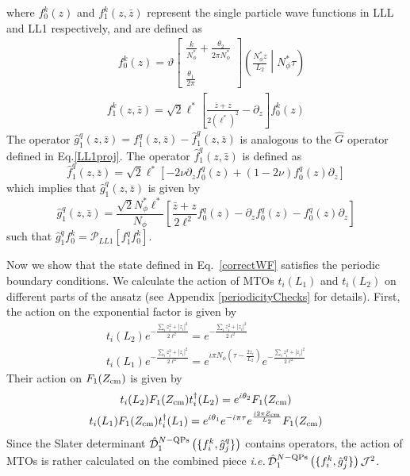 \documentclass[prb,aps,epsfig,longbibliography,twocolumn]{revtex4-1}
\newcommand{\ie}{\emph{i.e.}\,}
\newcommand{\rbkt}[1]{\left( #1\right)}
\newcommand{\sbkt}[1]{\left[ #1\right]}
\newcommand{\np}{N_{\phi}}
\newcommand{\jbkt}[2]{\left( #1 \middle| #2\right)}
\newcommand{\rtheta}[4]{\vartheta \sbkt{ \substack{{#1} \\ \\{#2}}}	\jbkt{#3}{#4}}
\newcommand{\iiota}{\dot{\iota}}
\begin{document}
where $f_0^{k}(z)$ and $f^{k}_1(z,\bar{z})$ represent the single particle wave functions in LLL and LL1 respectively, and are defined as \cite{Pu2017}
\begin{gather}
\quad f_0^{k}(z) = \rtheta{\frac{k}{\np^*} +\frac{\theta_2}{2\pi \np^*}}{\frac{\theta_1}{2\pi}}{\frac{\np^* z}{L_2} }{\np^*\tau} \nonumber\\
f^{k}_1(z,\bar{z})= \sqrt{2}{\ell^{*}}\sbkt{\frac{\bar{z}+z}{2(\ell^*)^{2}} -\partial_z} f^{k}_0(z) \label{singleParticleOrbitals}
\end{gather}
The operator $\hat{g}^{q}_1(z,\bar{z})=f^{q}_1(z,\bar{z})-\hat{f}^{q}_1(z,\bar{z})$ is analogous to the $\hat{G}$ operator defined in Eq.\eqref{LL1proj}. The operator $\hat{f}^{q}_1(z,\bar{z})$ is defined as
\begin{equation}
\hat{f}^{q}_1(z,\bar{z}) = \sqrt{2}\ell^* \sbkt{-2\nu \partial_z f^{q}_0(z) + (1-2\nu)f^{q}_0(z) \partial_z}
\end{equation}
which implies that $\hat{g}^{q}_1(z,\bar{z})$ is given by
\begin{equation} \label{ghat}
\hat{g}^{q}_1(z,\bar{z})=  \frac{\sqrt{2}\np^*\ell^*}{\np} \sbkt{ \frac{\bar{z}+z}{2\ell^{2}}f^{q}_0(z) - \partial_z f^{q}_0(z) - f^{q}_0(z) \partial_z} \nonumber
\end{equation}
such that $\hat{g}^{q}_1 f_0^{k}=\mathcal{P}_{LL1} \sbkt{f^{q}_1 f_0^{k}}$.

Now we show that the state defined in Eq.~\eqref{correctWF} satisfies the periodic boundary conditions. We calculate the action of MTOs $t_i(L_1)$ and $t_i(L_2)$ on different parts of the ansatz (see Appendix \ref{periodicityChecks} for details). First, the action on the exponential factor is given by 
\begin{gather}
t_i(L_2){e^{-\frac{\sum_i z^2_i+|z_i|^2 }{2\ell^2}}}= {e^{-\frac{\sum_i z^2_i+|z_i|^2 }{2\ell^2}}} \label{tl11}\\
t_i(L_1){e^{-\frac{\sum_i z^2_i+|z_i|^2 }{2\ell^2}}}= e^{\iiota \pi \np \rbkt{\tau-\frac{2z_i}{L_2}} }{e^{-\frac{\sum_i z^2_i+|z_i|^2 }{2\ell^2}}}\label{tl21}
\end{gather}
Their action on $F_1(Z_{\rm cm})$ is given by
\begin{gather}
t_i(L_2)F_1(Z_{\rm cm})t^{\dagger}_i(L_2)=e^{\iiota \theta_2}F_1(Z_{\rm cm}) \label{tl12}\\
t_i(L_1)F_1(Z_{\rm cm})t^{\dagger}_i(L_1)=e^{\iiota \theta_1}e^{-\iiota \pi \tau}e^{\frac{ \iiota 2\pi Z_{\rm cm}}{L_2}} F_1(Z_{\rm cm}) \label{tl22}
\end{gather}
Since the Slater determinant $\hat{\mathcal{D}}^{ N\rm-QPs}_{1}\rbkt{\{f^k_i,\hat{g}^q_j\}}$ contains operators, the action of MTOs is rather calculated on the combined piece \ie  $\hat{\mathcal{D}}^{ N\rm-QPs}_{1}\rbkt{\{f^k_i,\hat{g}^q_j\}}\mathcal{J}^2$. 
\end{document}
